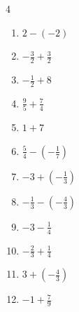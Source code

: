 \begin{multicols}{4}
\begin{enumerate}
  \item $\displaystyle 2 - \left(-2\right)$

        \phantom{$\displaystyle =4$}

  \item $\displaystyle -\frac{3}{2} + \frac{3}{2}$

        \phantom{$\displaystyle =0$}

  \item $\displaystyle -\frac{1}{2} + 8$


  \item $\displaystyle \frac{9}{5} + \frac{7}{4}$


  \item $\displaystyle 1 + 7$

        \phantom{$\displaystyle =8$}

  \item $\displaystyle \frac{5}{4} - \left(-\frac{1}{7}\right)$


  \item $\displaystyle -3 + \left(-\frac{1}{3}\right)$


  \item $\displaystyle -\frac{1}{3} - \left(-\frac{4}{3}\right)$

        \phantom{$\displaystyle =1$}

  \item $\displaystyle -3 - \frac{1}{4}$


\columnbreak %

  \item $\displaystyle -\frac{2}{3} + \frac{1}{4}$


  \item $\displaystyle 3 + \left(-\frac{4}{3}\right)$


  \item $\displaystyle -1 + \frac{7}{9}$



\end{enumerate}
\end{multicols}
